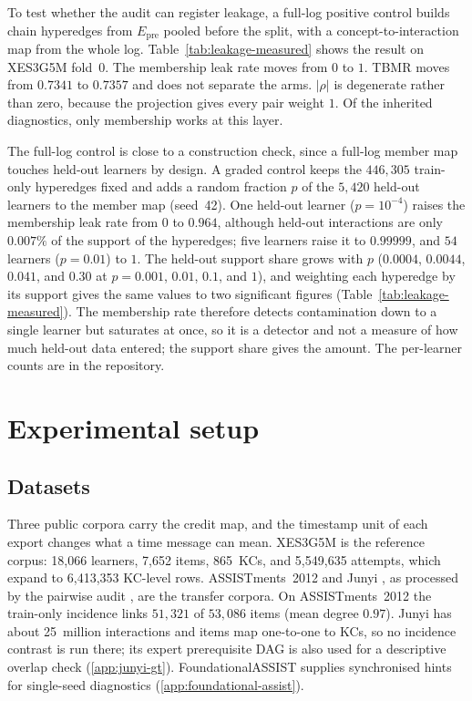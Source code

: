 \documentclass[review,12pt]{elsarticle}
\begin{document}
To test whether the audit can register leakage, a full-log positive
control builds chain hyperedges from $E_{\mathrm{pre}}$ pooled before
the split, with a concept-to-interaction map from the whole log.
Table~\ref{tab:leakage-measured} shows the result on XES3G5M fold~0.
The membership leak rate moves from $0$ to $1$. TBMR moves from $0.7341$
to $0.7357$ and does not separate the arms. $|\rho|$ is degenerate
rather than zero, because the projection gives every pair weight $1$.
Of the inherited diagnostics, only membership works at this layer.

The full-log control is close to a construction check, since a full-log
member map touches held-out learners by design. A graded control keeps
the $446{,}305$ train-only hyperedges fixed and adds a random fraction
$p$ of the $5{,}420$ held-out learners to the member map (seed~42). One
held-out learner ($p{=}10^{-4}$) raises the membership leak rate from
$0$ to $0.964$, although held-out interactions are only $0.007\%$ of the
support of the hyperedges; five learners raise it to $0.99999$, and
$54$ learners ($p{=}0.01$) to $1$. The held-out support share grows
with $p$ ($0.0004$, $0.0044$, $0.041$, and $0.30$ at $p{=}0.001$,
$0.01$, $0.1$, and $1$), and weighting each hyperedge by its support
gives the same values to two significant figures
(Table~\ref{tab:leakage-measured}). The membership rate therefore
detects contamination down to a single learner but saturates at once,
so it is a detector and not a measure of how much held-out data
entered; the support share gives the amount. The per-learner counts
are in the repository.



\section{Experimental setup}
\label{sec:setup}

\subsection{Datasets}
\label{sec:reuse}
Three public corpora carry the credit map, and the timestamp unit of
each export changes what a time message can mean.
XES3G5M \cite{liu2023xes3g5m} is the reference corpus: 18{,}066
learners, 7{,}652 items, 865~KCs, and 5{,}549{,}635 attempts, which
expand to 6{,}413{,}353 KC-level rows. ASSISTments~2012
\cite{feng2009assist} and Junyi \cite{chang2015junyi}, as
processed by the pairwise audit \cite{daominh2026p0}, are the transfer
corpora. On ASSISTments~2012 the train-only incidence links $51{,}321$
of $53{,}086$ items (mean degree $0.97$). Junyi has about 25~million
interactions and items map one-to-one to KCs, so no incidence contrast
is run there; its expert prerequisite DAG is also used for a
descriptive overlap check (\ref{app:junyi-gt}). FoundationalASSIST
\cite{foundationalassist2026} supplies synchronised hints for
single-seed diagnostics (\ref{app:foundational-assist}).
\end{document}
